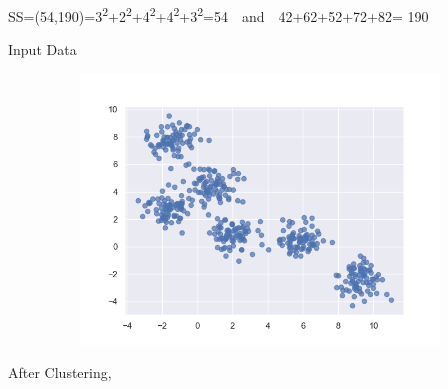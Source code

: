 \documentclass[12pt]{article}
\renewcommand{\_}{\kern-1.5pt\textunderscore\kern-1.5pt}
\begin{document}
\begin{enumerate}
\setlength{\parskip}{0.0pt}
{\fontsize{11pt}{13.2pt}\selectfont \textcolor[HTML]{333333}{SS=(54,190)=3\textsuperscript{2}+2\textsuperscript{2}+4\textsuperscript{2}+4\textsuperscript{2}+3\textsuperscript{2}=54  and  42+62+52+72+82= 190}\par}\par


\vspace{\baselineskip}

\vspace{\baselineskip}

\vspace{\baselineskip}

\vspace{\baselineskip}

\vspace{\baselineskip}

\vspace{\baselineskip}
Input Data\par




\begin{figure}[H]
	\begin{Center}
		\includegraphics[width=4.85in,height=2.82in]{./media/image3.png}
	\end{Center}
\end{figure}



\par

After Clustering, \par





\end{enumerate}
\end{document}
